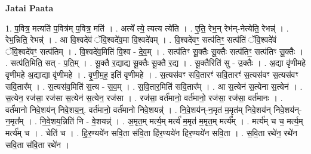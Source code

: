 \documentclass[17pt]{extarticle}
\begin{document}
\textbf{Jatai Paata} \newline

1. प॒वित्र॒ मत्यति॑ प॒वित्र॑म् प॒वित्र॒ मति॑ । . अत्ये᳚ त्ये॒ त्यत्य त्ये॑ति । . ए॒ति॒ रेभ॒न् रेभ॑न्-नेत्येति॒ रेभन्न्॑ । . रेभ॒न्निति॒ रेभन्न्॑ । . आ वि॒श्वदे॑वं ॅवि॒श्वदे॑व॒मा वि॒श्वदे॑वम् । . वि॒श्वदे॑वꣳ॒॒ सत्प॑तिꣳ॒॒ सत्प॑तिं ॅवि॒श्वदे॑वं ॅवि॒श्वदे॑वꣳ॒॒ सत्प॑तिम् । . वि॒श्वदे॑व॒मिति॑ वि॒श्व - दे॒व॒म् । . सत्प॑तिꣳ सू॒क्तैः सू॒क्तैः सत्प॑तिꣳ॒॒ सत्प॑तिꣳ सू॒क्तैः । . सत्प॑ति॒मिति॒ सत् - प॒ति॒म् । . सू॒क्तै र॒द्याद्य सू॒क्तैः सू॒क्तै र॒द्य । . सू॒क्तैरिति॑ सु - उ॒क्तैः । . अ॒द्या वृ॑णीमहे वृणीमहे अ॒द्याद्या वृ॑णीमहे । . वृ॒णी॒म॒ह॒ इति॑ वृणीमहे । . स॒त्यस॑वꣳ सवि॒तारꣳ॑ सवि॒तारꣳ॑ स॒त्यस॑वꣳ स॒त्यस॑वꣳ सवि॒तार᳚म् । . स॒त्यस॑व॒मिति॑ स॒त्य - स॒व॒म् । . स॒वि॒तार॒मिति॑ सवि॒तार᳚म् । . आ स॒त्येन॑ स॒त्येना स॒त्येन॑ । . स॒त्येन॒ रज॑सा॒ रज॑सा स॒त्येन॑ स॒त्येन॒ रज॑सा । . रज॑सा॒ वर्त॑मानो॒ वर्त॑मानो॒ रज॑सा॒ रज॑सा॒ वर्त॑मानः । . वर्त॑मानो निवे॒शय॑न् निवे॒शय॒न्॒. वर्त॑मानो॒ वर्त॑मानो निवे॒शयन्न्॑ । . नि॒वे॒शय॑न्-न॒मृत॑ म॒मृत॑म् निवे॒शय॑न् निवे॒शय॑न्-न॒मृत᳚म् । . नि॒वे॒शय॒न्निति॑ नि - वे॒शयन्न्॑ । . अ॒मृत॒म् मर्त्य॒म् मर्त्य॑ म॒मृत॑ म॒मृत॒म् मर्त्य᳚म् । . मर्त्य॑म् च च॒ मर्त्य॒म् मर्त्य॑म् च । . चेति॑ च । . हि॒र॒ण्यये॑न सवि॒ता स॑वि॒ता हि॑र॒ण्यये॑न हिर॒ण्यये॑न सवि॒ता । . स॒वि॒ता रथे॑न॒ रथे॑न सवि॒ता स॑वि॒ता रथे॑न । \newline
\end{document}
